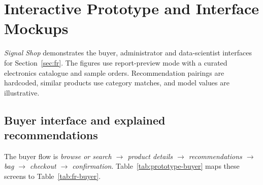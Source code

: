 \documentclass[a4paper,12pt]{article}
\begin{document}
\clearpage
\section{Interactive Prototype and Interface Mockups}
\label{sec:prototype}

\emph{Signal Shop} demonstrates the buyer, administrator and data-scientist
interfaces for Section~\ref{sec:fr}. The figures use report-preview mode with a
curated electronics catalogue and sample orders. Recommendation pairings are
hardcoded, similar products use category matches, and model values are illustrative.

\subsection{Buyer interface and explained recommendations}
\label{sec:prototype-buyer}

The buyer flow is \emph{browse or search $\rightarrow$ product details
$\rightarrow$ recommendations $\rightarrow$ bag $\rightarrow$ checkout
$\rightarrow$ confirmation}. Table~\ref{tab:prototype-buyer} maps these screens to
Table~\ref{tab:fr-buyer}.
\end{document}

